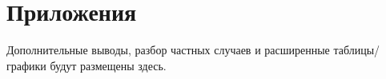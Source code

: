 \section{Приложения}
Дополнительные выводы, разбор частных случаев и расширенные таблицы/графики будут размещены здесь.
